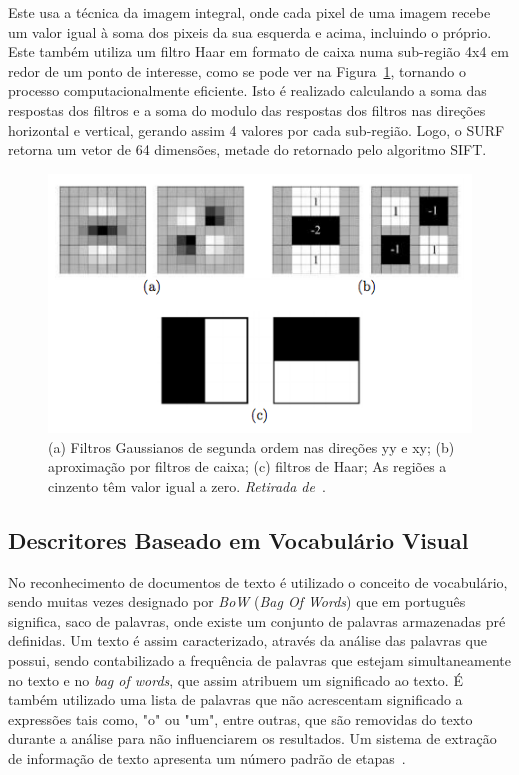 Este usa a técnica da imagem integral, onde cada pixel de uma imagem recebe um valor igual à soma dos pixeis da sua esquerda e acima, incluindo o próprio. Este também utiliza um filtro Haar em formato de caixa numa sub-região 4x4 em redor de um ponto de interesse, como se pode ver na Figura~\ref{fig:surf}, tornando o processo computacionalmente eficiente. Isto é realizado calculando a soma das respostas dos filtros e a soma do modulo das respostas dos filtros nas direções horizontal e vertical, gerando assim 4 valores por cada sub-região. Logo, o SURF retorna um vetor de 64 dimensões, metade do retornado pelo algoritmo SIFT.

\begin{figure}[h]
\centering
\includegraphics[width=0.7\linewidth]{./figures/surf}
\caption{ (a) Filtros Gaussianos de segunda ordem nas direções yy e xy; (b) aproximação por filtros de caixa; (c) filtros de Haar; As regiões a cinzento têm valor igual a zero. \textit{Retirada de}~\cite{Bay2006}.}
\label{fig:surf}
\end{figure}



\subsection{Descritores Baseado em Vocabulário Visual}\label{subsec: vocab}

No reconhecimento de documentos de texto é utilizado o conceito de vocabulário, sendo muitas vezes designado por \textit{BoW} (\textit{Bag Of Words}) que em português significa, saco de palavras, onde existe um conjunto de palavras armazenadas pré definidas. Um texto é assim caracterizado, através da análise das palavras que possui, sendo contabilizado a frequência de palavras que estejam simultaneamente no texto e no \textit{bag of words}, que assim atribuem um significado ao texto. É também utilizado uma lista de palavras que não acrescentam significado a expressões tais como, "o" ou "um", entre outras, que são removidas do texto durante a análise para não influenciarem os resultados. Um sistema de extração de informação de texto apresenta um número padrão de etapas~\cite{Baeza-Yates1999}. 


